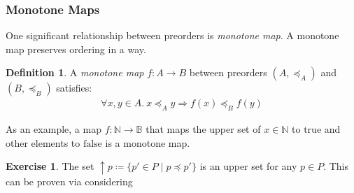 \documentclass[12pt]{article}
\theoremstyle{definition}
\newtheorem{defn}{Definition}[section]
\newtheorem{ex}{Exercise}[section]
\newcommand{\T}{\text{true}}
\newcommand{\F}{\text{false}}
\begin{document}
	\subsubsection{Monotone Maps}
	
	One significant relationship between preorders is \emph{monotone map}. A monotone map preserves ordering in a way.
	
	\begin{defn}
		A \emph{monotone map} $f: A \to B$ between preorders $(A, \preceq_A)$ and $(B, \preceq_B)$ satisfies:
		\begin{gather*}
			\forall x, y \in A.\ x \preceq_A y \Rightarrow f(x) \preceq_B f(y)
		\end{gather*}
	\end{defn}
	
	As an example, a map $f: \mathbb{N} \to \mathbb{B}$ that maps the upper set of $x \in \mathbb{N}$ to $\T$ and other elements to $\F$ is a monotone map.
	
	\begin{ex}
		The set $\uparrow p \coloneqq \{p'\in P \mid p \preceq p'\}$ is an upper set for any $p \in P$. This can be proven via considering
	\end{ex}

	
\end{document}
